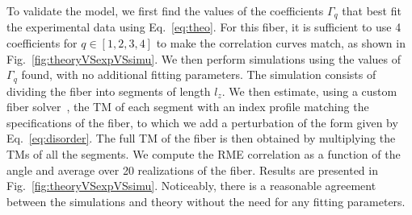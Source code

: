\documentclass[aps,prl,twocolumn, amsmath,amssymb,superscriptaddress]{revtex4-2}
\begin{document}
To validate the model, 
we first find the values of the coefficients $\Gamma_q$ that best fit the experimental data 
using Eq.~\ref{eq:theo}. 
For this fiber, it is sufficient to use 4 coefficients for $q \in [1,2,3,4]$
to make the correlation curves match, 
as shown in Fig.~\ref{fig:theoryVSexpVSsimu}.
We then perform simulations using the values of $\Gamma_q$ found, 
with no additional fitting parameters. 
The simulation consists of dividing the fiber into segments of length $l_z$. 
We then estimate, using a custom fiber solver~\cite{pyMMF}, 
the TM of each segment with an index profile matching the specifications of the fiber, 
to which we add a perturbation of the form given by Eq.~\ref{eq:disorder}. 
The full TM of the fiber is then obtained by multiplying the TMs of all the segments.
We compute the RME correlation as a function of the angle and average over 20 realizations of the fiber.
Results are presented in Fig.~\ref{fig:theoryVSexpVSsimu}.
Noticeably, there is a reasonable agreement between the simulations and theory 
without the need for any fitting parameters.
\end{document}
